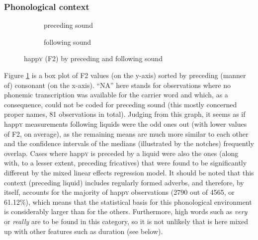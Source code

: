 \subsubsection{Phonological context}
\label{sec.prod.res.vow.happy.f2.phon}

\begin{figure}[h!]
	\centering
	\begin{subfigure}{.49\textwidth}
		\centering
			\resizebox{\linewidth}{!}{} 
		\caption{preceding sound}
		\label{fig.box.f2w.happy.presound}
	\end{subfigure}
	\begin{subfigure}{.49\textwidth}
		\centering
			\resizebox{\linewidth}{!}{} 
		\caption{following sound}
		\label{fig.box.f2w.happy.follsound}
	\end{subfigure}
	\caption{happ\textsc{y} (F2) by preceding and following sound}
\end{figure}

Figure \ref{fig.box.f2w.happy.presound} is a box plot of F2 values (on the y-axis) sorted by preceding (manner of) consonant (on the x-axis).
``NA'' here stands for observations where no phonemic transcription was available for the carrier word and which, as a consequence, could not be coded for preceding sound (this mostly concerned proper names, 81 observations in total).
Judging from this graph, it seems as if happ\textsc{y} measurements following liquids were the odd ones out (with lower values of F2, on average), as the remaining means are much more similar to each other and the confidence intervals of the medians (illustrated by the notches) frequently overlap.
Cases where happ\textsc{y} is preceded by a liquid were also the ones (along with, to a lesser extent, preceding fricatives) that were found to be significantly different by the mixed linear effects regression model.
It should be noted that this context (preceding liquid) includes regularly formed adverbs, and therefore, by itself, accounts for the majority of happ\textsc{y} observations (2790 out of 4565, or 61.12\%), which means that the statistical basis for this phonological environment is considerably larger than for the others.
Furthermore, high  words such as \emph{very} or \emph{really} are to be found in this category, so it is not unlikely that  is here mixed up with other features such as duration (see below).

